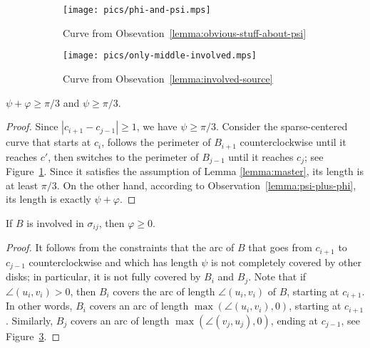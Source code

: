 \begin{enumerate}[label={\bf Case \arabic*: }, wide, labelwidth=!, labelindent=0pt]
\begin{figure}[h!]
    \centering
    \begin{subfigure}[t]{.4\textwidth}
    \texttt{[image: pics/phi-and-psi.mps]}
    \caption{Curve from Obsevation~\ref{lemma:obvious-stuff-about-psi}}
    \label{fig:phi-and-psi}
    \end{subfigure}
    \begin{subfigure}[t]{.4\textwidth}
    \texttt{[image: pics/only-middle-involved.mps]}
    \caption{Curve from Obsevation~\ref{lemma:involved-source}}
    \label{fig:only-middle-involved}
    \end{subfigure}
    \caption{}
\end{figure}

\begin{observation} \label{lemma:obvious-stuff-about-psi}
$\psi + \varphi\geq \pi/3$ and $\psi\geq \pi/3$.
\end{observation}

\begin{proof}
Since $|c_{i+1} - c_{j-1}| \geq 1$, we have $\psi\geq\pi/3$. Consider the sparse-centered curve that starts at $c_i$, follows the perimeter of $B_{i+1}$ counterclockwise until it reaches $c'$, then switches to the perimeter of $B_{j-1}$ until it reaches $c_j$; see Figure~\ref{fig:phi-and-psi}. Since it satisfies the assumption of Lemma \ref{lemma:master}, its length is at least $\pi/3$. On the other hand, according to Observation~\ref{lemma:psi-plus-phi}, its length is exactly $\psi + \varphi$.
\end{proof}

\begin{observation}
If $B$ is involved in $\sigma_{ij}$, then $\varphi\geq 0$. \label{lemma:involved-source}
\end{observation}

\begin{proof}
It follows from the constraints that the arc of $B$ that goes from $c_{i+1}$ to $c_{j-1}$ counterclockwise and which has length $\psi$ is not completely covered by other disks; in particular, it is not fully covered by $B_i$ and $B_j$.
Note that if $\angle(u_i, v_i) > 0$, then $B_i$ covers the arc of length $\angle(u_i, v_i)$ of $B$, starting at $c_{i+1}$. In other words, $B_i$ covers an arc of length $\max(\angle(u_i, v_i), 0)$, starting at $c_{i+1}$. Similarly, $B_j$ covers an arc of length $\max(\angle(v_j, u_j), 0)$, ending at $c_{j-1}$, see Figure~\ref{fig:only-middle-involved}.


\end{proof}
\end{enumerate}
